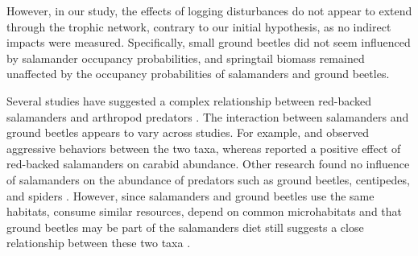 However, in our study, the effects of logging disturbances do not appear to extend through the trophic network, contrary to our initial hypothesis, as no indirect impacts were measured.
Specifically, small ground beetles did not seem influenced by salamander occupancy probabilities, and springtail biomass remained unaffected by the occupancy probabilities of salamanders and ground beetles.

Several studies have suggested a complex relationship between red-backed salamanders and arthropod predators \citep{Gall2003BehavioralInteractions,Walton2006Salamandersforestfloor,Hickerson2018Behavioralinteractions}. 
The interaction between salamanders and ground beetles appears to vary across studies.  
For example, \cite{Gall2003BehavioralInteractions} and \cite{Ovaska1988Predatorybehavior} observed aggressive behaviors between the two taxa, whereas \cite{Hickerson2012Interactionsforestfloor} reported a positive effect of red-backed salamanders on carabid abundance. 
Other research found no influence of salamanders on the abundance of predators such as ground beetles, centipedes, and spiders \citep{Hocking2013Effectsexperimental}. 
However, since salamanders and ground beetles use the same habitats, consume similar resources, depend on common microhabitats and that ground beetles may be part of the salamanders diet still suggests a close relationship between these two taxa \citep{Jaeger1980MicrohabitatsTerrestrial,loveiEcologyBehaviorGround1996}.

